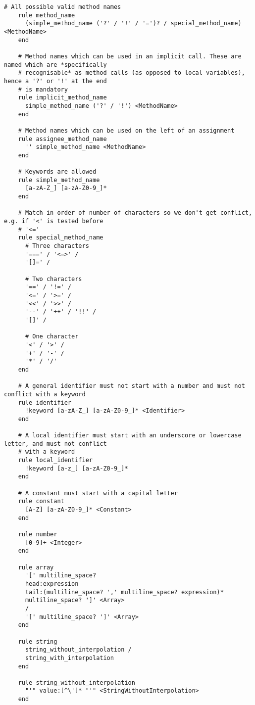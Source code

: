 \begin{lstlisting}[title={\small\ttfamily\bfseries parser/language.treetop},language=treetop]
    # All possible valid method names
    rule method_name
      (simple_method_name ('?' / '!' / '=')? / special_method_name) <MethodName>
    end
    
    # Method names which can be used in an implicit call. These are named which are *specifically
    # recognisable* as method calls (as opposed to local variables), hence a '?' or '!' at the end
    # is mandatory
    rule implicit_method_name
      simple_method_name ('?' / '!') <MethodName>
    end
    
    # Method names which can be used on the left of an assignment
    rule assignee_method_name
      '' simple_method_name <MethodName>
    end
    
    # Keywords are allowed
    rule simple_method_name
      [a-zA-Z_] [a-zA-Z0-9_]*
    end
    
    # Match in order of number of characters so we don't get conflict, e.g. if '<' is tested before
    # '<='
    rule special_method_name
      # Three characters
      '===' / '<=>' /
      '[]=' /
      
      # Two characters
      '==' / '!=' /
      '<=' / '>=' /
      '<<' / '>>' /
      '--' / '++' / '!!' /
      '[]' /
      
      # One character
      '<' / '>' /
      '+' / '-' /
      '*' / '/'
    end
    
    # A general identifier must not start with a number and must not conflict with a keyword
    rule identifier
      !keyword [a-zA-Z_] [a-zA-Z0-9_]* <Identifier>
    end
    
    # A local identifier must start with an underscore or lowercase letter, and must not conflict
    # with a keyword
    rule local_identifier
      !keyword [a-z_] [a-zA-Z0-9_]*
    end
    
    # A constant must start with a capital letter
    rule constant
      [A-Z] [a-zA-Z0-9_]* <Constant>
    end
    
    rule number
      [0-9]+ <Integer>
    end
    
    rule array
      '[' multiline_space?
      head:expression
      tail:(multiline_space? ',' multiline_space? expression)*
      multiline_space? ']' <Array>
      /
      '[' multiline_space? ']' <Array>
    end
    
    rule string
      string_without_interpolation /
      string_with_interpolation
    end
    
    rule string_without_interpolation
      "'" value:[^\']* "'" <StringWithoutInterpolation>
    end
    

\end{lstlisting}
